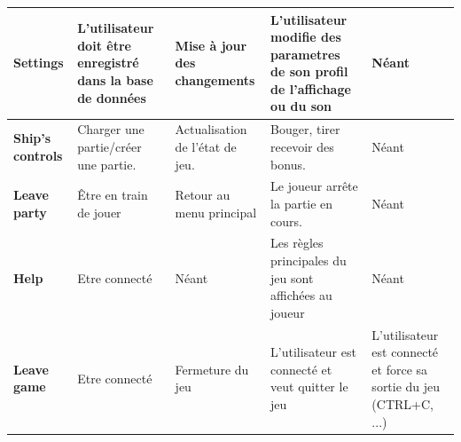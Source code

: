 \documentclass[a4paper,12pt]{article}
\begin{document}
\begin{center}
\begin{longtable}{|p{}||p{}|p{}|p{}|p{}|}
\hline
\hline
\textbf{Settings}     & L'utilisateur doit être enregistré dans la base de données   & Mise à jour des changements  & L'utilisateur modifie des parametres de son profil de l'affichage ou du son  & Néant\\
\hline
\hline
\textbf{Ship’s controls}  & Charger une partie/créer une partie.   & Actualisation de l’état de jeu.  & Bouger, tirer recevoir des bonus.  & Néant\\
\hline
\hline
\textbf{Leave party}      & Être en train de jouer   & Retour au menu principal  & Le joueur arrête la partie en cours.  & Néant\\
\hline
\hline
\textbf{Help}      & Etre connecté   & Néant  & Les règles principales du jeu sont affichées au joueur & Néant\\
\hline
\hline
\textbf{Leave game}      & Etre connecté   & Fermeture du jeu  & L'utilisateur est connecté et veut quitter le jeu  & L'utilisateur est connecté et force sa sortie du jeu (CTRL+C, ...)\\
\hline
\end{longtable}
\end{center}
\end{document}
